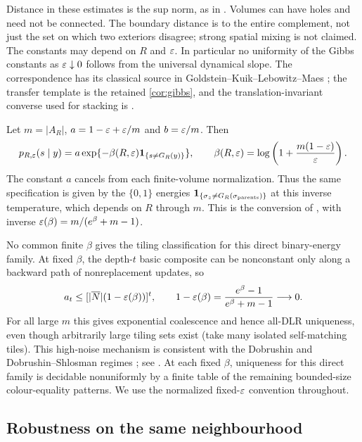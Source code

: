 Distance in these estimates is the sup norm, as in \cite[Definition~2.3]{DM26}. Volumes can have holes and need not be connected. The boundary distance is to the entire complement, not just the set on which two exteriors disagree; strong spatial mixing is not claimed. The constants may depend on $R$ and $\varepsilon$. In particular no uniformity of the Gibbs constants as $\varepsilon\downarrow0$ follows from the universal dynamical slope. The correspondence has its classical source in Goldstein--Kuik--Lebowitz--Maes \cite{GKLM89}; the transfer template is the retained \cref{cor:gibbs}, and the translation-invariant converse used for stacking is \cite[Corollary~10.4]{DM26}.

\begin{remark}\label{nw:temperature}
Let $m=|A_R|$, $a=1-\varepsilon+\varepsilon/m$ and $b=\varepsilon/m$. Then
\[
 p_{R,\varepsilon}(s\mid y)=a\exp\{-\beta(R,\varepsilon)
          \mathbf1_{\{s\ne G_R(y)\}}\},\qquad
 \beta(R,\varepsilon)=\log\left(1+\frac{m(1-\varepsilon)}{\varepsilon}\right).
\]
The constant $a$ cancels from each finite-volume normalization. Thus the same specification is given by the $\{0,1\}$ energies $\mathbf1_{\{\sigma_z\ne G_R(\sigma_{\rm parents})\}}$ at this inverse temperature, which depends on $R$ through $m$. This is the conversion of \cite[Corollary~B]{DMdiagram}, with inverse $\varepsilon(\beta)=m/(e^\beta+m-1)$.

No common finite $\beta$ gives the tiling classification for this direct binary-energy family. At fixed $\beta$, the depth-$t$ basic composite can be nonconstant only along a backward path of nonreplacement updates, so
\[
 a_t\le[|\overline N|(1-\varepsilon(\beta))]^t,\qquad
 1-\varepsilon(\beta)=\frac{e^\beta-1}{e^\beta+m-1}\longrightarrow0.
\]
For all large $m$ this gives exponential coalescence and hence all-DLR uniqueness, even though arbitrarily large tiling sets exist (take many isolated self-matching tiles). This high-noise mechanism is consistent with the Dobrushin and Dobrushin--Shlosman regimes \cite{Dob68,DS85}; see \cite[Remark~13.9]{DM26}. At each fixed $\beta$, uniqueness for this direct family is decidable nonuniformly by a finite table of the remaining bounded-size colour-equality patterns. We use the normalized fixed-$\varepsilon$ convention throughout.
\end{remark}

\subsection{Robustness on the same neighbourhood}

